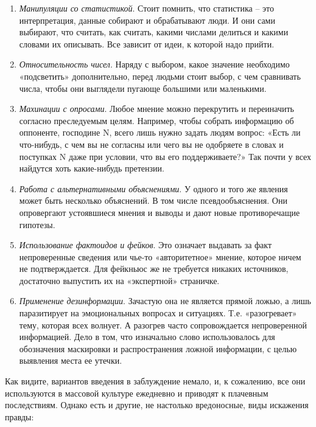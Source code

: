\begin{enumerate}
    \item \textit{Манипуляции со статистикой}. Стоит помнить, что статистика – это интерпретация, данные собирают и обрабатывают люди. И они сами выбирают, что считать, как считать, какими числами делиться и какими словами их описывать. Все зависит от идеи, к которой надо прийти.
    \item \textit{Относительность чисел}. Наряду с выбором, какое значение необходимо «подсветить» дополнительно, перед людьми стоит выбор, с чем сравнивать числа, чтобы они выглядели пугающе большими или маленькими.
    \item \textit{Махинации с опросами}. Любое мнение можно перекрутить и переиначить согласно преследуемым целям. Например, чтобы собрать информацию об оппоненте, господине N, всего лишь нужно задать людям вопрос: «Есть ли что-нибудь, с чем вы не согласны или чего вы не одобряете в словах и поступках N даже при условии, что вы его поддерживаете?» Так почти у всех найдутся хоть какие-нибудь претензии.
    \item \textit{Работа с альтернативными объяснениями}. У одного и того же явления может быть несколько объяснений. В том числе псевдообъяснения. Они опровергают устоявшиеся мнения и выводы и дают новые противоречащие гипотезы.
    \item \textit{Использование фактоидов и фейков}. Это означает выдавать за факт непроверенные сведения или чье-то «авторитетное» мнение, которое ничем не подтверждается. Для фейкньюс же не требуется никаких источников, достаточно выпустить их на «экспертной» страничке.
    \item \textit{Применение дезинформации}. Зачастую она не является прямой ложью, а лишь паразитирует на эмоциональных вопросах и ситуациях. Т.е. «разогревает» тему, которая всех волнует. А разогрев часто сопровождается непроверенной информацией. Дело в том, что изначально слово использовалось для обозначения маскировки и распространения ложной информации, с целью выявления места ее утечки.
\end{enumerate}

Как видите, вариантов введения в заблуждение немало, и, к сожалению, все они используются в массовой культуре ежедневно и приводят к плачевным последствиям. Однако есть и другие, не настолько вредоносные, виды искажения правды:


